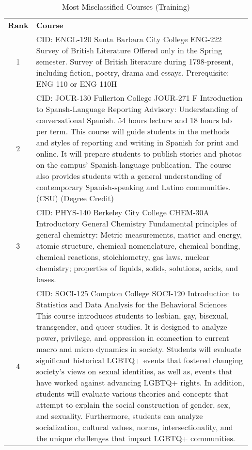 \begin{longtable}{ >{\baselineskip=12pt}c >{\baselineskip=12pt}p{} }
\captionsetup{skip=5pt}
\caption{Most Misclassified Courses (Training)}\label{tab:fp_overlap}\\
\toprule
\textbf{\textbf{Rank}} & \textbf{\textbf{Course}} \\
\midrule
\endhead
1 & CID: ENGL-120 \newline
Santa Barbara City College \newline
ENG-222 Survey of British Literature \newline
Offered only in the Spring semester. Survey of British literature during 1798-present, including fiction, poetry, drama and essays. Prerequisite: ENG 110 or ENG 110H\\
\midrule
2 & CID: JOUR-130 \newline
Fullerton College \newline
JOUR-271 F Introduction to Spansh-Language Reporting \newline
Advisory: Understanding of conversational Spanish. 54 hours lecture and 18 hours lab per term. This course will guide students in the methods and styles of reporting and writing in Spanish for print and online. It will prepare students to publish stories and photos on the campus' Spanish-language publication. The course also provides students with a general understanding of contemporary Spanish-speaking and Latino communities. (CSU) (Degree Credit)\\
\midrule
3 & CID: PHYS-140 \newline
Berkeley City College \newline
CHEM-30A Introductory General Chemistry \newline
Fundamental principles of general chemistry: Metric measurements, matter and energy, atomic structure, chemical nomenclature, chemical bonding, chemical reactions, stoichiometry, gas laws, nuclear chemistry; properties of liquids, solids, solutions, acids, and bases.\\
\midrule
4 & CID: SOCI-125 \newline
Compton College \newline
SOCI-120 Introduction to Statistics and Data Analysis for the Behavioral Sciences \newline
This course introduces students to lesbian, gay, bisexual, transgender, and queer studies. It is designed to analyze power, privilege, and oppression in connection to current macro and micro dynamics in society. Students will evaluate significant historical LGBTQ+ events that fostered changing society's views on sexual identities, as well as, events that have worked against advancing LGBTQ+ rights. In addition, students will evaluate various theories and concepts that attempt to explain the social construction of gender, sex, and sexuality. Furthermore, students can analyze socialization, cultural values, norms, intersectionality, and the unique challenges that impact LGBTQ+ communities.\\

\end{longtable}
